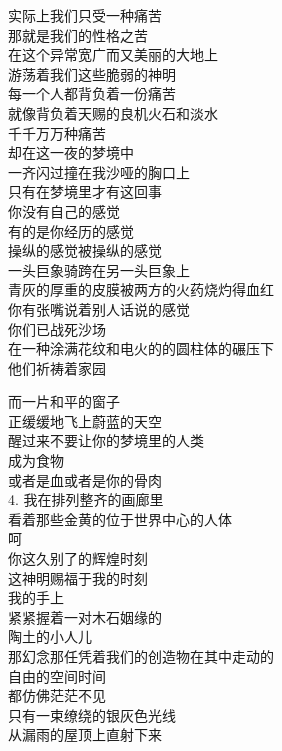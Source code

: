 \documentclass{article}
\begin{document}
实际上我们只受一种痛苦
\\
那就是我们的性格之苦 \\ 


在这个异常宽广而又美丽的大地上\\
游荡着我们这些脆弱的神明\\
每一个人都背负着一份痛苦\\
就像背负着天赐的良机火石和淡水\\
千千万万种痛苦\\
却在这一夜的梦境中
\\
一齐闪过撞在我沙哑的胸口上 \\ 


只有在梦境里才有这回事\\
你没有自己的感觉\\
有的是你经历的感觉\\
操纵的感觉被操纵的感觉\\
一头巨象骑跨在另一头巨象上\\
青灰的厚重的皮膜被两方的火药烧灼得血红\\
你有张嘴说着别人话说的感觉\\
你们已战死沙场\\
在一种涂满花纹和电火的的圆柱体的碾压下\\
他们祈祷着家园\\
\newpage

而一片和平的窗子
\\
正缓缓地飞上蔚蓝的天空 \\ 


醒过来不要让你的梦境里的人类\\
成为食物
\\
或者是血或者是你的骨肉 \\ 


4. 我在排列整齐的画廊里\\
看着那些金黄的位于世界中心的人体\\
呵\\
你这久别了的辉煌时刻\\
这神明赐福于我的时刻\\
我的手上\\
紧紧握着一对木石姻缘的
\\
陶土的小人儿 \\ 


那幻念那任凭着我们的创造物在其中走动的\\
自由的空间时间\\
都仿佛茫茫不见\\
只有一束缭绕的银灰色光线\\
从漏雨的屋顶上直射下来\\
\newpage
\end{document}

